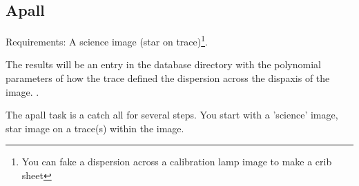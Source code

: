 \subsection{Apall}

Requirements: A science image (star on trace)\footnote{ 
  You can fake a dispersion across a calibration lamp image to make a crib sheet}.

The results will be an entry in the database directory with the polynomial 
parameters of how the trace defined the dispersion across the dispaxis
of the image.  .

The apall task is a catch all for several steps. You start
with a 'science' image, star image on a trace(s) within the
image.
